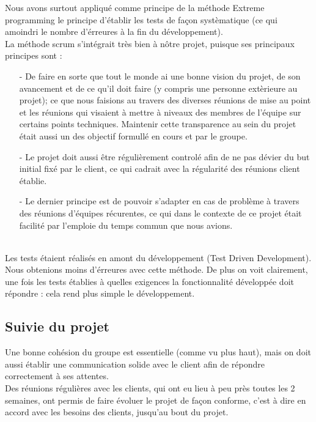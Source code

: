Nous avons surtout appliqué comme principe de la méthode Extreme programming le principe d'établir les tests de façon systèmatique (ce qui amoindri le nombre d'érreures à la fin du développement).
\\

La méthode scrum s'intégrait très bien à nôtre projet, puisque ses principaux principes sont :
\begin{itemize}
\item[-] De faire en sorte que tout le monde ai une bonne vision du projet, de son avancement et de ce qu'il doit faire (y compris une personne extèrieure au projet); ce que nous faisions au travers des diverses réunions de mise au point et les réunions qui visaient à mettre à niveaux des membres de l'équipe sur certains points techniques.
Maintenir cette transparence au sein du projet était aussi un des objectif formullé en cours et par le groupe.
\item[-] Le projet doit aussi être régulièrement controlé afin de ne pas dévier du but initial fixé par le client, ce qui cadrait avec la régularité des réunions client établie.
\item[-] Le dernier principe est de pouvoir s'adapter en cas de problème à travers des réunions d'équipes récurentes, ce qui dans le contexte de ce projet était facilité par l'emploie du temps commun que nous avions.
\end{itemize}

\\

Les tests étaient réalisés en amont du développement (Test Driven Development). Nous obtenions moins d'érreures avec cette méthode.
De plus on voit clairement, une fois les tests établies à quelles exigences la fonctionnalité développée doit répondre : cela rend plus simple le développement.\\

\subsection{Suivie du projet}

Une bonne cohésion du groupe est essentielle (comme vu plus haut), mais on doit aussi établir une communication solide avec le client afin de répondre correctement à ses attentes.\\

Des réunions régulières avec les clients, qui ont eu lieu à peu près toutes les 2 semaines, ont permis de faire évoluer le projet de façon conforme, c'est à dire en accord avec les besoins des clients, jusqu'au bout du projet.\\

